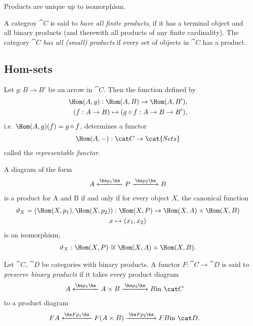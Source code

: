 \documentclass{article}
\begin{document}
\begin{theorem}[Awodey 2.17]
    Products are unique up to isomorphism.
\end{theorem}

\begin{definition}[Awodey 2.19]
    A categroy $\cat C$ is said to \emph{have all finite products}, if it has a
    terminal object and all binary products (and therewith all products of any
    finite cardinality). The category $\cat C$ \emph{has all (small) products}
    if every set of objects in $\cat C$ has a product.
\end{definition}

\subsection{Hom-sets}

\begin{theorem}
    Let $g:B\to B'$ be an arrow in $\cat C$. Then the function
    defined by
    \begin{align*}
        \Hom(A, g):\Hom(A,B)\to\Hom(A,B'),\\
        (f:A\to B) \mapsto (g\circ f:A\to B\to B'),
    \end{align*}
    i.e. $\Hom(A,g)(f)=g\circ f$, determines a functor
    \begin{align*}
        \Hom(A,-):\cat C \to \cat{Sets}
    \end{align*}
    called the \emph{representable functor}.
\end{theorem}

\begin{proposition}[Awodey 2.20]
    A diagram of the form
    \begin{align*}
        A \xlongleftarrow{\hs p_1\hs} P \xlongrightarrow{\hs p_2\hs} B
    \end{align*}
    is a product for A and B if and only if for every object $X$, the canonical
    function
    \begin{gather*}
        \vartheta_X = (\Hom(X, p_1), \Hom(X, p_2)) : \Hom(X, P)\to \Hom(X,A)\times \Hom(X,B)\\
        x \mapsto (x_1, x_2)
    \end{gather*}
    is an isomorphism,
    \begin{align*}
        \vartheta_X:\Hom(X,P)\cong \Hom(X,A)\times\Hom(X,B).
    \end{align*}
\end{proposition}

\begin{definition}[Awodey 2.21]
    Let $\cat C$, $\cat D$ be categories with binary products. A functor
    $F:\cat C\to \cat D$ is said to \emph{preserve binary products} if it takes
    every product diagram
    \begin{align*}
        A \xlongleftarrow{\hs p_1\hs} A\times B \xlongrightarrow{\hs p_2\hs} B&\text{in }\cat C
    \end{align*}
    to a product diagram
    \begin{align*}
        FA\xlongleftarrow{\hs Fp_1\hs} F(A\times B)\xlongrightarrow{\hs Fp_2\hs}FB &\text{in }\cat D.
    \end{align*}
\end{definition}
\end{document}
